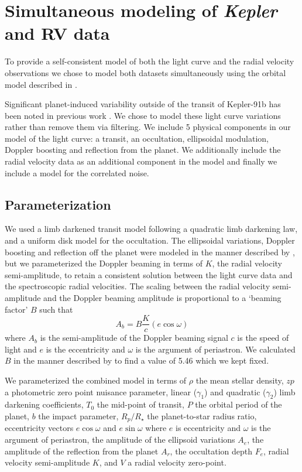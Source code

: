 \documentclass[apjl]{emulateapj}
\begin{document}
\section{Simultaneous modeling of \emph{Kepler} and RV data}
To provide a self-consistent model of both the light curve and the radial velocity observations we chose to model both datasets simultaneously using the orbital model described in \citet{rowe14}.

Significant planet-induced variability outside of the transit of Kepler-91b has been noted in previous work \citep{lillo14,esteves13}. We chose to model these light curve variations rather than remove them via filtering.  We include 5 physical components in our model of the light curve: a transit, an occultation, ellipsoidal modulation, Doppler boosting and reflection from the planet. We additionally include the radial velocity data as an additional component in the model and finally we include a model for the correlated noise.


\subsection{Parameterization}
We used a limb darkened transit model \citep{mandel02} following a quadratic limb darkening law, and a uniform disk model for the occultation. The ellipsoidal variations, Doppler boosting and reflection off the planet were modeled in the manner described by \citet{lillo14}, but we parameterized the Doppler beaming in terms of $K$, the radial velocity semi-amplitude, to retain a consistent solution between the light curve data and the spectroscopic radial velocities. The scaling between the radial velocity semi-amplitude and the Doppler beaming amplitude is proportional to a `beaming factor' $B$ such that
\begin{equation}
A_b = B \frac{K}{c} (e\cos{\omega})
\end{equation}
where $A_b$ is the semi-amplitude of the Doppler beaming signal $c$ is the speed of light and $e$ is the eccentricity and $\omega$ is the argument of periastron. We calculated $B$ in the manner described by \citet{bloemen11} to find a value of 5.46 which we kept fixed.

We parameterized the combined model in terms of $\rho$ the mean stellar density, $zp$ a photometric zero point nuisance parameter, linear ($\gamma_1$) and quadratic ($\gamma_2$) limb darkening coefficients, $T_0$ the mid-point of transit, $P$ the orbital period of the planet, $b$ the impact parameter, $R_{p}/R_{\star}$ the planet-to-star radius ratio, eccentricity vectors $e\cos{\omega}$ and $e\sin{\omega}$ where $e$ is eccentricity and $\omega$ is the argument of periastron, the amplitude of the ellipsoid variations $A_e$, the amplitude of the reflection from the planet $A_r$, the occultation depth $F_e$, radial velocity semi-amplitude $K$, and $V$ a radial velocity zero-point.
\end{document}
